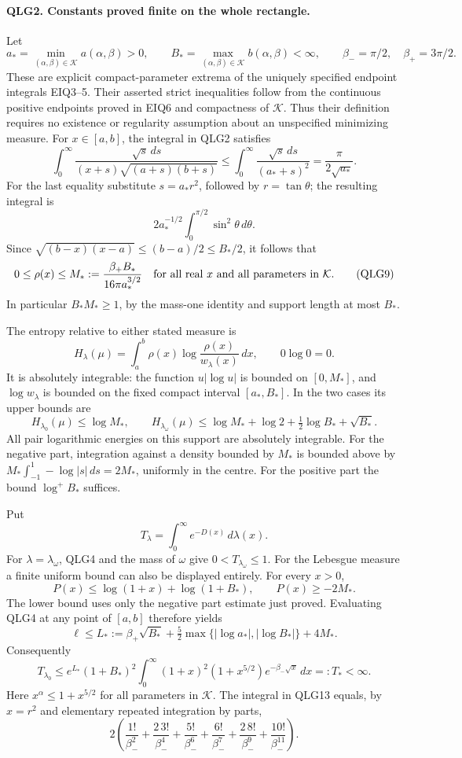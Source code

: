 \documentclass[11pt,a4paper]{article}
\begin{document}
\paragraph{QLG2. Constants proved finite on the whole rectangle.}
Let
\[
 a_* =\min_{(\alpha,\beta)\in\mathcal K} a(\alpha,\beta)>0,
 \qquad B_* =\max_{(\alpha,\beta)\in\mathcal K} b(\alpha,\beta)<\infty,
 \qquad \beta_-=\pi/2,\quad\beta_+=3\pi/2.
 \tag{QLG8}
\]
These are explicit compact-parameter extrema of the uniquely specified
endpoint integrals EIQ3--5. Their asserted strict inequalities follow
from the continuous positive endpoints proved in EIQ6 and compactness
of \(\mathcal K\). Thus their definition requires no existence or
regularity assumption about an unspecified minimizing measure.
For \(x\in[a,b]\), the integral in QLG2 satisfies
\[
 \int_0^\infty\frac{\sqrt{s}\,ds}{(x+s)\sqrt{(a+s)(b+s)}}
 \leq\int_0^\infty\frac{\sqrt{s}\,ds}{(a_*+s)^2}
 =\frac{\pi}{2\sqrt{a_*}}.
\]
For the last equality substitute \(s=a_*r^2\), followed by
\(r=\tan\theta\); the resulting integral is
\[2a_*^{-1/2}\int_0^{\pi/2}\sin^2\theta\,d\theta.\]
Since \(\sqrt{(b-x)(x-a)}\leq(b-a)/2\leq B_*/2\), it follows that
\[
 0\leq\rho(x)\leq M_*:=\frac{\beta_+B_*}{16\pi a_*^{3/2}}
       \quad\hbox{for all real }x\hbox{ and all parameters in }\mathcal K.
 \tag{QLG9}
\]
In particular \(B_*M_*\geq1\), by the mass-one identity and support
length at most \(B_*\).

The entropy relative to either stated measure is
\[
 H_\lambda(\mu)=\int_a^b
                 \rho(x)\log\frac{\rho(x)}{w_\lambda(x)}\,dx,
       \qquad 0\log0=0.
 \tag{QLG10}
\]
It is absolutely integrable: the function \(u|\log u|\) is bounded
on \([0,M_*]\), and \(\log w_\lambda\) is bounded on the fixed
compact interval \([a_*,B_*]\). In the two cases its upper bounds are
\[
 H_{\lambda_0}(\mu)\leq\log M_* ,\qquad
 H_{\lambda_\omega}(\mu)\leq
 \log M_*+\log2+\tfrac12\log B_*+\sqrt{B_*}.
 \tag{QLG11}
\]
All pair logarithmic energies on this support are absolutely
integrable. For the negative part, integration against a density
bounded by \(M_*\) is bounded above by
\(M_*\int_{-1}^1-\log|s|\,ds=2M_*\), uniformly in the centre.
For the positive part the bound \(\log^+ B_*\) suffices.

Put
\[
 T_\lambda=\int_0^\infty e^{-D(x)}\,d\lambda(x).
 \tag{QLG12}
\]
For \(\lambda=\lambda_\omega\), QLG4 and the mass of \(\omega\)
give \(0<T_{\lambda_\omega}\leq1\). For the Lebesgue measure a finite
uniform bound can also be displayed entirely. For every \(x>0\),
\[
 P(x)\leq\log(1+x)+\log(1+B_*),\qquad P(x)\geq-2M_*.
\]
The lower bound uses only the negative part estimate just proved.
Evaluating QLG4 at any point of \([a,b]\) therefore yields
\[
 \ell\leq L_*:=\beta_+\sqrt{B_*}
    +\tfrac52\max\{|\log a_*|,|\log B_*|\}+4M_*.
\]
Consequently
\[
 T_{\lambda_0}\leq e^{L_*}(1+B_*)^2
    \int_0^\infty (1+x)^2(1+x^{5/2})e^{-\beta_-\sqrt{x}}\,dx
    =:T_*<\infty.
 \tag{QLG13}
\]
Here \(x^\alpha\leq1+x^{5/2}\) for all parameters in \(\mathcal K\).
The integral in QLG13 equals, by \(x=r^2\) and elementary repeated
integration by parts,
\[
 2\left(\frac{1!}{\beta_-^2}
       +\frac{2\,3!}{\beta_-^4}
       +\frac{5!}{\beta_-^6}
       +\frac{6!}{\beta_-^7}
       +\frac{2\,8!}{\beta_-^9}
       +\frac{10!}{\beta_-^{11}}\right).
 \tag{QLG14}
\]
\end{document}

